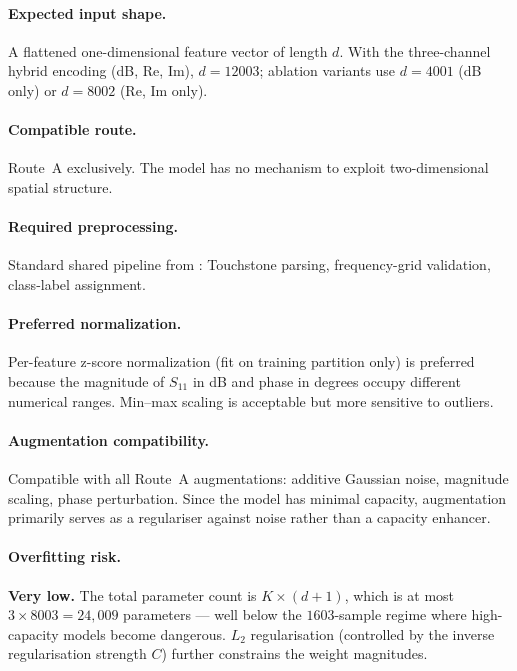 \paragraph{Expected input shape.}
A flattened one-dimensional feature vector of length $d$.  With the
three-channel hybrid encoding (dB, Re, Im), $d = 12003$; ablation
variants use $d = 4001$ (dB only) or $d = 8002$ (Re, Im only).

\paragraph{Compatible route.}
Route~A exclusively.  The model has no mechanism to exploit
two-dimensional spatial structure.

\paragraph{Required preprocessing.}
Standard shared pipeline from : Touchstone parsing,
frequency-grid validation, class-label assignment.

\paragraph{Preferred normalization.}
Per-feature z-score normalization (fit on training partition only) is
preferred because the magnitude of $S_{11}$ in dB and phase in degrees
occupy different numerical ranges.  Min--max scaling is acceptable but
more sensitive to outliers.

\paragraph{Augmentation compatibility.}
Compatible with all Route~A augmentations: additive Gaussian noise,
magnitude scaling, phase perturbation.  Since the model has minimal
capacity, augmentation primarily serves as a regulariser against
noise rather than a capacity enhancer.

\paragraph{Overfitting risk.}
\textbf{Very low.}  The total parameter count is $K \times (d + 1)$,
which is at most $3 \times 8003 = 24{,}009$ parameters --- well below
the $\num{1603}$-sample regime where high-capacity models become
dangerous.  $L_2$ regularisation (controlled by the inverse
regularisation strength $C$) further constrains the weight magnitudes.

